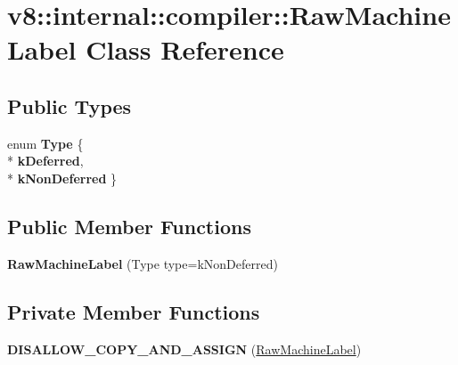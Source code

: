 \hypertarget{classv8_1_1internal_1_1compiler_1_1_raw_machine_label}{}\section{v8\+:\+:internal\+:\+:compiler\+:\+:Raw\+Machine\+Label Class Reference}
\label{classv8_1_1internal_1_1compiler_1_1_raw_machine_label}
\subsection*{Public Types}
\begin{DoxyCompactItemize}
\item 
enum {\bfseries Type} \{ \\*
{\bfseries k\+Deferred}, 
\\*
{\bfseries k\+Non\+Deferred}
 \}\hypertarget{classv8_1_1internal_1_1compiler_1_1_raw_machine_label_aa5b9e2d6c7b396e8a33dad1a076b3fae}{}\label{classv8_1_1internal_1_1compiler_1_1_raw_machine_label_aa5b9e2d6c7b396e8a33dad1a076b3fae}

\end{DoxyCompactItemize}
\subsection*{Public Member Functions}
\begin{DoxyCompactItemize}
\item 
{\bfseries Raw\+Machine\+Label} (Type type=k\+Non\+Deferred)\hypertarget{classv8_1_1internal_1_1compiler_1_1_raw_machine_label_ae8cc384c9e887ebc3e0c6b8bca058dbd}{}\label{classv8_1_1internal_1_1compiler_1_1_raw_machine_label_ae8cc384c9e887ebc3e0c6b8bca058dbd}

\end{DoxyCompactItemize}
\subsection*{Private Member Functions}
\begin{DoxyCompactItemize}
\item 
{\bfseries D\+I\+S\+A\+L\+L\+O\+W\+\_\+\+C\+O\+P\+Y\+\_\+\+A\+N\+D\+\_\+\+A\+S\+S\+I\+GN} (\hyperlink{classv8_1_1internal_1_1compiler_1_1_raw_machine_label}{Raw\+Machine\+Label})\hypertarget{classv8_1_1internal_1_1compiler_1_1_raw_machine_label_afed52e26616fa6e577b66ea63854e1f8}{}\label{classv8_1_1internal_1_1compiler_1_1_raw_machine_label_afed52e26616fa6e577b66ea63854e1f8}

\end{DoxyCompactItemize}
